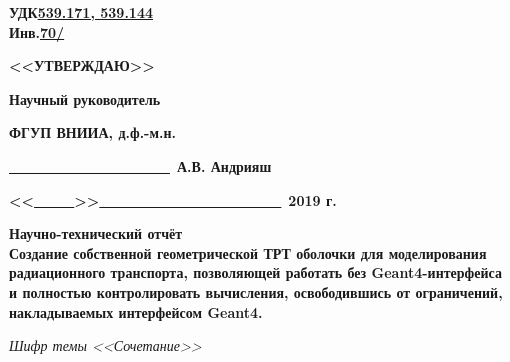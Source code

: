 \documentclass[a4paper,12pt]{article}
\begin{document}
\begin{flushleft}
{\bfseries УДК\underline{\hspace{1cm}539.171, 539.144\hspace{1. cm}}}\\
{\bfseries Инв.\textnumero\underline{\hspace{1.5cm}70/       \hspace{1.5 cm}}}
\end{flushleft}
\vspace{-1.8cm} {\begin{list}{}{,4cm}
\vspace{-0.15cm}\item{\bf<<УТВЕРЖДАЮ>>}
\vspace{-0.15cm}\item{\bfseries Научный руководитель}
\vspace{-0.15cm}\item{\bfseries ФГУП ВНИИА, д.ф.-м.н.}
\vspace{-0.15cm}\item\underline{~~~~~~~~~~~~~~~~~~~~~~~}~{\bfseries А.В. Андрияш}
\vspace{-0.15cm}
\item{\bf<<\underline{~~~~~}>>}\underline{~~~~~~~~~~~~~~~~~~~~~~~~~~}~{\bf2019 г.}
\end{list}}


\large

\begin{center}

\vspace{.2cm}


{\bfseries Научно-технический отчёт\\
 Создание собственной геометрической ТРТ оболочки для моделирования радиационного транспорта, позволяющей работать без Geant4-интерфейса и полностью контролировать вычисления, освободившись от ограничений, накладываемых интерфейсом Geant4.
}

\vspace{0.2cm} \emph{Шифр темы <<Сочетание>>}
\end{center}
\end{document}
